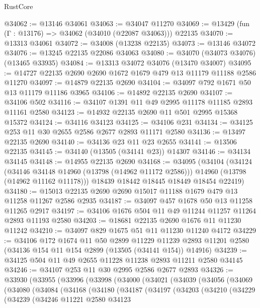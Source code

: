 \begin{lexlean}{RustCore}
\begin{coremodule}
@34062 := @13146 @34061
@34063 := @34047 @11270
@34069 := @13429 (fun (Γ : @13176) => @34062 (@34010 (@22087 @34063))) @22135
@34070 := @13313 @34061
@34072 := @34008 (@13238 @22135)
@34073 := @13146 @34072
@34076 := @13245 @22135 @22086 @34063
@34080 := @34070 (@34073 @34076) (@13465 @33935)
@34084 := @13313 @34072 @34076 (@13470 @34007)
@34095 := @14727 @22135 @2690 @2690 @1672 @1679 @479 @13 @11179 @11188 @2586 @11270
@34097 := @14879 @22135 @2690
@34104 := @34097 @792 @1671 @50 @13 @11179 @11186 @3965
@34106 := @14892 @22135 @2690
@34107 := @34106 @502
@34116 := @34107 @1391 @11 @49 @2995 @11178 @11185 @2893 @11161 @2580
@34123 := @14932 @22135 @2690 @11 @501 @2995 @15368 @15372
@34124 := @34116 @34123
@34125 := @34106 @231
@34134 := @34125 @253 @11 @30 @2655 @2586 @2677 @2893 @11171 @2580
@34136 := @13497 @22135 @2690
@34140 := @34136 @23 @11 @23 @2655
@34141 := @13506 @22135
@34145 := @34140 (@13505 (@34141 @23)) @14307
@34146 := @34134 @34145
@34148 := @14955 @22135 @2690
@34168 := @34095
    (@34104
      (@34124
        (@34146 @34148 @14960 (@13798 (@14962 @11172 @2586)))
        @14960
        (@13798 (@14962 @11162 @11178)))
      @18439
      @18442
      @18445
      @18449
      @18454
      @22419)
@34180 := @15013 @22135 @2690 @2690 @15017 @11188 @1679 @479 @13 @11258 @11267 @2586 @2935
@34187 := @34097 @457 @1678 @50 @13 @11258 @11265 @2917
@34197 := @34106 @1676 @504 @11 @49 @11244 @11257 @11264 @2893 @11193 @2580
@34203 := @18681 @22135 @2690 @1676 @11 @11230 @11242
@34210 := @34097 @829 @1675 @51 @11 @11230 @11240 @4172
@34229 := @34106
    @172
    @1674
    @11
    @50
    @2899
    @11229
    @11239
    @2893
    @11201
    @2580
    (@34136 @154 @11 @154 @2899 (@13505 (@34141 @154)) @14916)
@34239 := @34125 @504 @11 @49 @2655 @11228 @11238 @2893 @11211 @2580 @34145
@34246 := @34107 @253 @11 @30 @2995 @2586 @2677 @2893
@34326 := @33930
    (@33955
      (@33996
        (@33998
          (@34000
            (@34021
              (@34039
                (@34056
                  (@34069
                    (@34080
                      (@34084
                        (@34168
                          (@34180
                            (@34187
                              (@34197
                                (@34203
                                  (@34210
                                    (@34229
                                      (@34239
                                        (@34246
                                          @11221
                                          @2580
                                          @34123

\end{coremodule}
\end{lexlean}
